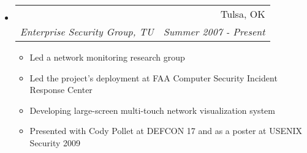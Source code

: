 \documentclass[letterpaper,11pt]{article}
\makeatletter
\newcommand{\resitem}[1]{\item #1 \vspace{-2pt}}
\newcommand{\ressubheading}[4]{
\begin{tabular*}{6.5in}{l@{\extracolsep{\fill}}r}
		\textbf{\parbox{5in}{\raggedright #1 }} & #2 \\
		\textit{#3} & \textit{#4} \\
\end{tabular*}\vspace{-6pt}}
\makeatother
\begin{document}
\begin{itemize}
\item
	\ressubheading{SAND/DVNE}{Tulsa, OK}{Enterprise Security Group, TU}{Summer 2007 - Present}
	\begin{itemize}
		\resitem{Led a network monitoring research group}
		\resitem{Led the project's deployment at FAA Computer Security Incident Response Center}
		\resitem{Developing large-screen multi-touch network visualization system}
		\resitem{Presented with Cody Pollet at DEFCON 17 and as a poster at USENIX Security 2009}
	\end{itemize}
\end{itemize}
\end{document}
